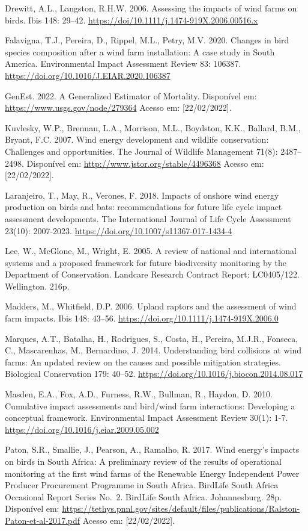 \documentclass[
  oneside]{scrbook}
\begin{document}
Drewitt, A.L., Langston, R.H.W. 2006. Assessing the impacts of wind farms on birds. Ibis 148: 29--42. \url{https://doi/10.1111/j.1474-919X.2006.00516.x}

Falavigna, T.J., Pereira, D., Rippel, M.L., Petry, M.V. 2020. Changes in bird species composition after a wind farm installation: A case study in South America. Environmental Impact Assessment Review 83: 106387. \url{https://doi.org/10.1016/J.EIAR.2020.106387}

GenEst. 2022. A Generalized Estimator of Mortality. Disponível em: \url{https://www.usgs.gov/node/279364} Acesso em: {[}22/02/2022{]}.

Kuvlesky, W.P., Brennan, L.A., Morrison, M.L., Boydston, K.K., Ballard, B.M., Bryant, F.C. 2007. Wind energy development and wildlife conservation: Challenges and opportunities. The Journal of Wildlife Management 71(8): 2487--2498. Disponível em: \url{http://www.jstor.org/stable/4496368} Acesso em: {[}22/02/2022{]}.

Laranjeiro, T., May, R., Verones, F. 2018. Impacts of onshore wind energy production on birds and bats: recommendations for future life cycle impact assessment developments. The International Journal of Life Cycle Assessment 23(10): 2007-2023. \url{https://doi.org/10.1007/s11367-017-1434-4}

Lee, W., McGlone, M., Wright, E. 2005. A review of national and international systems and a proposed framework for future biodiversity monitoring by the Department of Conservation. Landcare Research Contract Report: LC0405/122. Wellington. 216p.

Madders, M., Whitfield, D.P. 2006. Upland raptors and the assessment of wind farm impacts. Ibis 148: 43--56. \url{https://doi.org/10.1111/j.1474-919X.2006.0}

Marques, A.T., Batalha, H., Rodrigues, S., Costa, H., Pereira, M.J.R., Fonseca, C., Mascarenhas, M., Bernardino, J. 2014. Understanding bird collisions at wind farms: An updated review on the causes and possible mitigation strategies. Biological Conservation 179: 40--52. \url{https://doi.org/10.1016/j.biocon.2014.08.017}

Masden, E.A., Fox, A.D., Furness, R.W., Bullman, R., Haydon, D. 2010. Cumulative impact assessments and bird/wind farm interactions: Developing a conceptual framework. Environmental Impact Assessment Review 30(1): 1-7. \url{https://doi.org/10.1016/j.eiar.2009.05.002}

Paton, S.R., Smallie, J., Pearson, A., Ramalho, R. 2017. Wind energy's impacts on birds in South Africa: A preliminary review of the results of operational monitoring at the first wind farms of the Renewable Energy Independent Power Producer Procurement Programme in South Africa. BirdLife South Africa Occasional Report Series No.~2. BirdLife South Africa. Johannesburg. 28p. Disponível em: \url{https://tethys.pnnl.gov/sites/default/files/publications/Ralston-Paton-et-al-2017.pdf} Acesso em: {[}22/02/2022{]}.
\end{document}
